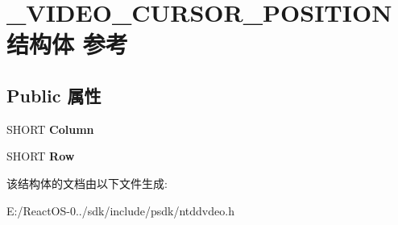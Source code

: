 \hypertarget{struct___v_i_d_e_o___c_u_r_s_o_r___p_o_s_i_t_i_o_n}{}\section{\+\_\+\+V\+I\+D\+E\+O\+\_\+\+C\+U\+R\+S\+O\+R\+\_\+\+P\+O\+S\+I\+T\+I\+O\+N结构体 参考}
\label{struct___v_i_d_e_o___c_u_r_s_o_r___p_o_s_i_t_i_o_n}
\subsection*{Public 属性}
\begin{DoxyCompactItemize}
\item 
\mbox{\label{struct___v_i_d_e_o___c_u_r_s_o_r___p_o_s_i_t_i_o_n_a9679db1ed1a3edfbf584a68618a97419}} 
S\+H\+O\+RT {\bfseries Column}
\item 
\mbox{\label{struct___v_i_d_e_o___c_u_r_s_o_r___p_o_s_i_t_i_o_n_a67afb8da52b13751084007eed360280f}} 
S\+H\+O\+RT {\bfseries Row}
\end{DoxyCompactItemize}


该结构体的文档由以下文件生成\+:\begin{DoxyCompactItemize}
\item 
E\+:/\+React\+O\+S-\/0../sdk/include/psdk/ntddvdeo.\+h\end{DoxyCompactItemize}
